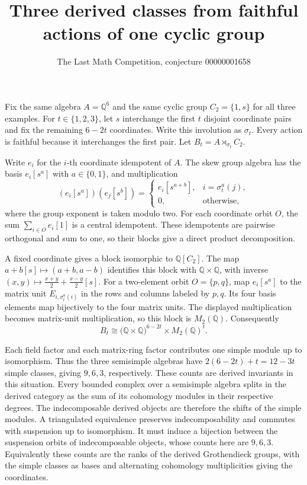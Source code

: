 \documentclass[11pt]{article}
\title{Three derived classes from faithful actions of one cyclic group}
\author{The Last Math Competition, conjecture 00000001658}
\date{}
\begin{document}
\maketitle

Fix the same algebra \(A=\mathbb Q^6\) and the same cyclic group
\(C_2=\{1,s\}\) for all three examples. For \(t\in\{1,2,3\}\), let \(s\)
interchange the first \(t\) disjoint coordinate pairs and fix the
remaining \(6-2t\) coordinates. Write this involution as \(\sigma_t\).
Every action is faithful because it interchanges the first pair.
Let \(B_t=A\rtimes_{\sigma_t}C_2\).

Write \(e_i\) for the \(i\)-th coordinate idempotent of \(A\). The skew
group algebra has the basis \(e_i[s^a]\) with \(a\in\{0,1\}\), and
multiplication
\[
 (e_i[s^a])(e_j[s^b])=
 \begin{cases}
 e_i[s^{a+b}], & i=\sigma_t^a(j),\\
 0, & \text{otherwise},
 \end{cases}
\]
where the group exponent is taken modulo two. For each coordinate orbit
\(O\), the sum \(\sum_{i\in O}e_i[1]\) is a central idempotent. These
idempotents are pairwise orthogonal and sum to one, so their blocks give
a direct product decomposition.

A fixed coordinate gives a block isomorphic to \(\mathbb Q[C_2]\).
The map \(a+b[s]\mapsto(a+b,a-b)\) identifies this block with
\(\mathbb Q\times\mathbb Q\), with inverse
\((x,y)\mapsto\frac{x+y}{2}+\frac{x-y}{2}[s]\).
For a two-element orbit \(O=\{p,q\}\), map \(e_i[s^a]\) to
the matrix unit \(E_{i,\sigma_t^a(i)}\) in the rows and columns labeled
by \(p,q\). Its four basis elements map bijectively to the four matrix
units. The displayed multiplication becomes matrix-unit multiplication,
so this block is \(M_2(\mathbb Q)\). Consequently
\[
 B_t \cong \bigl(\mathbb Q\times\mathbb Q\bigr)^{6-2t}
              \times M_2(\mathbb Q)^t .
\]

Each field factor and each matrix-ring factor contributes one simple
module up to isomorphism. Thus the three semisimple algebras have
\(2(6-2t)+t=12-3t\) simple classes, giving \(9,6,3\), respectively.
These counts are derived invariants in this situation. Every bounded
complex over a semisimple algebra splits in the derived category as the
sum of its cohomology modules in their respective degrees. The
indecomposable derived objects are therefore the shifts of the simple
modules. A triangulated equivalence preserves indecomposability and
commutes with suspension up to isomorphism. It must induce a bijection
between the suspension orbits of indecomposable objects, whose counts
here are \(9,6,3\). Equivalently these counts are the ranks of the
derived Grothendieck groups, with the simple classes as bases and
alternating cohomology multiplicities giving the coordinates.
\end{document}
